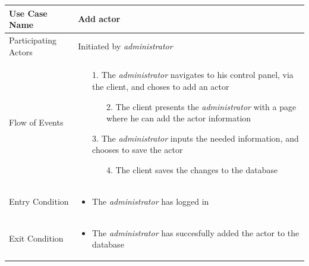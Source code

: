 \begin{center}
	\begin{tabular}{ | l | p{10cm} |  }
		 \hline
		Use Case Name & Add actor \\ \hline
		Participating Actors & Initiated by \emph{administrator} \\ \hline
		Flow of Events & \begin{enumerate}
						\item[1.] The \emph{administrator} navigates to his control panel, via the client, and choses to add an actor
						\begin{enumerate}
							\item[2.] The client presents the \emph{administrator} with a page where he can add the actor information
						\end{enumerate}
						\item[3.] The \emph{administrator} inputs the needed information, and chooses to save the actor
						\begin{enumerate}
							\item[4.] The client saves the changes to the database
						\end{enumerate}
					\end{enumerate} \\ \hline
		Entry Condition & \begin{itemize}
						\item The \emph{administrator} has logged in
					\end{itemize} \\ \hline
		Exit Condition & \begin{itemize}
						\item The \emph{administrator} has succesfully added the actor to the database
					\end{itemize} \\
		\hline
	\end{tabular}
\end{center}


